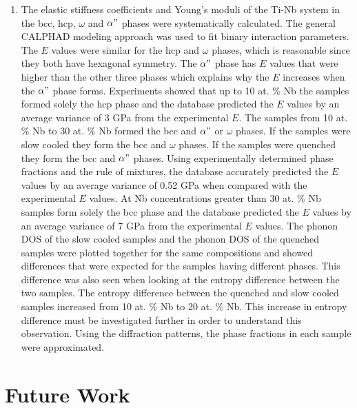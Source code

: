 \begin{enumerate}
	\item The elastic stiffness coefficients and Young's moduli of the Ti-Nb system in the bcc, hcp, $\omega$ and $\alpha"$ phases were systematically calculated. The general CALPHAD modeling approach was used to fit binary interaction parameters. The $E$ values were similar for the hcp and $\omega$ phases, which is reasonable since they both have hexagonal symmetry. The $\alpha"$ phase has $E$ values that were higher than the other three phases which explains why the $E$ increases when the $\alpha"$ phase forms. Experiments showed that up to 10 at. \% Nb the samples formed solely the hcp phase and the database predicted the $E$ values by an average variance of 3 GPa from the experimental $E$. The samples from 10 at. \% Nb to 30 at. \% Nb formed the bcc and $\alpha"$ or $\omega$ phases. If the samples were slow cooled they form the bcc and $\omega$ phases. If the samples were quenched they form the bcc and $\alpha"$ phases. Using experimentally determined phase fractions and the rule of mixtures, the database accurately predicted the $E$ values by an average variance of 0.52 GPa when compared with the experimental $E$ values. At Nb concentrations greater than 30 at. \% Nb samples form solely the bcc phase and the database predicted the $E$ values by an average variance of 7 GPa from the experimental $E$ values. The phonon DOS of the slow cooled samples and the phonon DOS of the quenched samples were plotted together for the same compositions and showed differences that were expected for the samples having different phases. This difference was also seen when looking at the entropy difference between the two samples. The entropy difference between the quenched and slow cooled samples increased from 10 at. \% Nb to 20 at. \% Nb. This increase in entropy difference must be investigated further in order to understand this observation. Using the diffraction patterns, the phase fractions in each sample were approximated. 
\end{enumerate}

\section{Future Work}


